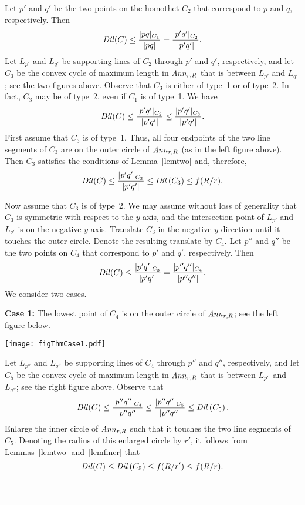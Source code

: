 \documentclass[12pt]{article}
\newcommand{\Ann}{\mathord{\it Ann}}
\newcommand{\Dil}{\mathord{\it Dil}}
\newcommand{\qed}{\rule{0.5em}{1.5ex}}
\newcommand{\fqed}{{\hfill~\qed}}
\newenvironment{proof}{{\noindent \bf Proof.}}
                      {{\hfill \fqed} \vspace{1em}}
\begin{document}
\begin{proof}
Let $p'$ and $q'$ be the two points on the homothet $C_2$ that correspond 
to $p$ and $q$, respectively. Then  
\[ \Dil(C) \leq \frac{|pq|_{C_1}}{|pq|} = \frac{|p'q'|_{C_2}}{|p'q'|} . 
\]  
Let $L_{p'}$ and $L_{q'}$ be supporting lines of $C_2$ through $p'$ 
and $q'$, respectively, and let $C_3$ be the convex cycle of maximum 
length in $\Ann_{r,R}$ that is between $L_{p'}$ and $L_{q'}$; see the 
two figures above. Observe that $C_3$ is either of type~1 or of type~2. 
In fact, $C_3$ may be of type~2, even if $C_1$ is of type~1. We have 
\[ \Dil(C) \leq \frac{|p'q'|_{C_2}}{|p'q'|} \leq 
         \frac{|p'q'|_{C_3}}{|p'q'|} . 
\] 
First assume that $C_3$ is of type~1. Thus, all four endpoints of the 
two line segments of $C_3$ are on the outer circle of $\Ann_{r,R}$ (as 
in the left figure above). Then $C_3$ satisfies the conditions of 
Lemma~\ref{lemtwo} and, therefore, 
\[ \Dil(C) \leq \frac{|p'q'|_{C_3}}{|p'q'|}  \leq 
           \Dil \left( C_3 \right) \leq f(R/r) . 
\]  

Now assume that $C_3$ is of type~2. We may assume without loss of 
generality that $C_3$ is symmetric with respect to the $y$-axis, 
and the intersection point of $L_{p'}$ and $L_{q'}$ is on the 
negative $y$-axis. Translate $C_3$ in the negative $y$-direction 
until it touches the outer circle. Denote the resulting translate 
by $C_4$. Let $p''$ and $q''$ be the two points on $C_4$ that correspond 
to $p'$ and $q'$, respectively. Then  
\[ \Dil(C) \leq \frac{|p'q'|_{C_3}}{|p'q'|} = 
          \frac{|p''q''|_{C_4}}{|p''q''|} . 
\] 
We consider two cases. 

\vspace{0.5em} 

\noindent 
{\bf Case 1:} The lowest point of $C_4$ is on the outer circle of 
$\Ann_{r,R}$; see the left figure below. 

\begin{center}
   \texttt{[image: figThmCase1.pdf]}
\end{center}

Let $L_{p''}$ and $L_{q''}$ be supporting lines of $C_4$ through $p''$ 
and $q''$, respectively, and let $C_5$ be the convex cycle of maximum 
length in $\Ann_{r,R}$ that is between $L_{p''}$ and $L_{q''}$; see 
the right figure above. Observe that 
\[ \Dil(C) \leq \frac{|p''q''|_{C_4}}{|p''q''|} \leq  
     \frac{|p''q''|_{C_5}}{|p''q''|} \leq \Dil \left( C_5 \right) . 
\] 
Enlarge the inner circle of $\Ann_{r,R}$ such that it touches the 
two line segments of $C_5$. Denoting the radius of this enlarged 
circle by $r'$, it follows from Lemmas~\ref{lemtwo} and~\ref{lemfincr} 
that 
\[ \Dil(C) \leq \Dil \left( C_5 \right) \leq f(R/r') \leq f(R/r) . 
\] 


\end{proof}
\end{document}
